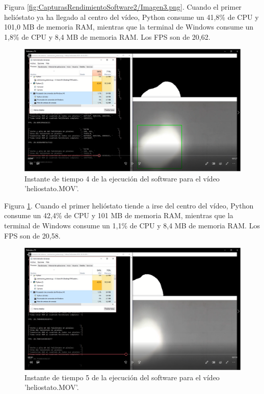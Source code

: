 Figura \ref{fig:CapturasRendimientoSoftware2/Imagen3.png}. Cuando el primer helióstato ya ha llegado al centro del vídeo, Python consume un 41,8\% de CPU y 101,0 MB de memoria RAM, mientras que la terminal de Windows consume un 1,8\% de CPU y 8,4 MB de memoria RAM. Los FPS son de 20,62.\\[20pt]

\begin{figure}[h!]
  	\centering
	\includegraphics[width=\textwidth]{CapturasRendimientoSoftware2/Imagen4.png}
	\caption{Instante de tiempo 4 de la ejecución del software para el vídeo 'heliostato.MOV'.
	\label{fig:CapturasRendimientoSoftware2/Imagen4.png}}
\end{figure}

Figura \ref{fig:CapturasRendimientoSoftware2/Imagen4.png}. Cuando el primer helióstato tiende a irse del centro del vídeo, Python consume un 42,4\% de CPU y 101 MB de memoria RAM, mientras que la terminal de Windows consume un 1,1\% de CPU y 8,4 MB de memoria RAM. Los FPS son de 20,58.\\[20pt]

\begin{figure}[h!]
  	\centering
	\includegraphics[width=\textwidth]{CapturasRendimientoSoftware2/Imagen5.png}
	\caption{Instante de tiempo 5 de la ejecución del software para el vídeo 'heliostato.MOV'.
	\label{fig:CapturasRendimientoSoftware2/Imagen5.png}}
\end{figure}

